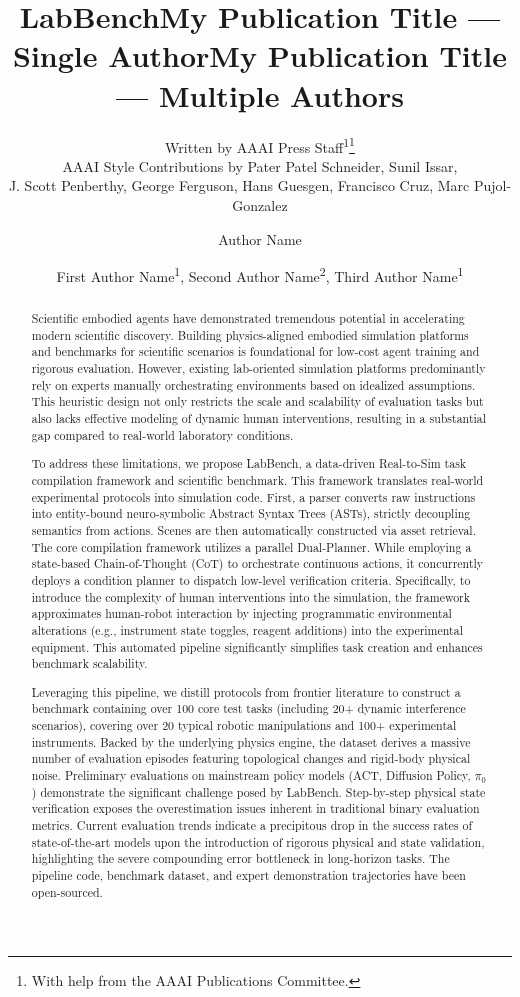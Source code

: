 \documentclass[letterpaper]{article} %
\title{LabBench}
\author{
    Written by AAAI Press Staff\textsuperscript{\rm 1}\thanks{With help from the AAAI Publications Committee.}\\
    AAAI Style Contributions by Pater Patel Schneider,
    Sunil Issar,\\
    J. Scott Penberthy,
    George Ferguson,
    Hans Guesgen,
    Francisco Cruz\equalcontrib,
    Marc Pujol-Gonzalez\equalcontrib
}
\title{My Publication Title --- Single Author}
\author {
    Author Name
}
\title{My Publication Title --- Multiple Authors}
\author {
    First Author Name\textsuperscript{\rm 1},
    Second Author Name\textsuperscript{\rm 2},
    Third Author Name\textsuperscript{\rm 1}
}
\begin{document}
\maketitle

\begin{abstract}
Scientific embodied agents have demonstrated tremendous potential in accelerating modern scientific discovery. Building physics-aligned embodied simulation platforms and benchmarks for scientific scenarios is foundational for low-cost agent training and rigorous evaluation. However, existing lab-oriented simulation platforms predominantly rely on experts manually orchestrating environments based on idealized assumptions. This heuristic design not only restricts the scale and scalability of evaluation tasks but also lacks effective modeling of dynamic human interventions, resulting in a substantial gap compared to real-world laboratory conditions. 

To address these limitations, we propose LabBench, a data-driven Real-to-Sim task compilation framework and scientific benchmark. This framework translates real-world experimental protocols into simulation code. First, a parser converts raw instructions into entity-bound neuro-symbolic Abstract Syntax Trees (ASTs), strictly decoupling semantics from actions. Scenes are then automatically constructed via asset retrieval. The core compilation framework utilizes a parallel Dual-Planner. While employing a state-based Chain-of-Thought (CoT) to orchestrate continuous actions, it concurrently deploys a condition planner to dispatch low-level verification criteria. Specifically, to introduce the complexity of human interventions into the simulation, the framework approximates human-robot interaction by injecting programmatic environmental alterations (e.g., instrument state toggles, reagent additions) into the experimental equipment. This automated pipeline significantly simplifies task creation and enhances benchmark scalability. 

Leveraging this pipeline, we distill protocols from frontier literature to construct a benchmark containing over 100 core test tasks (including 20+ dynamic interference scenarios), covering over 20 typical robotic manipulations and 100+ experimental instruments. Backed by the underlying physics engine, the dataset derives a massive number of evaluation episodes featuring topological changes and rigid-body physical noise. Preliminary evaluations on mainstream policy models (ACT, Diffusion Policy, $\pi_0$) demonstrate the significant challenge posed by LabBench. Step-by-step physical state verification exposes the overestimation issues inherent in traditional binary evaluation metrics. Current evaluation trends indicate a precipitous drop in the success rates of state-of-the-art models upon the introduction of rigorous physical and state validation, highlighting the severe compounding error bottleneck in long-horizon tasks. The pipeline code, benchmark dataset, and expert demonstration trajectories have been open-sourced.\end{abstract}
\end{document}
